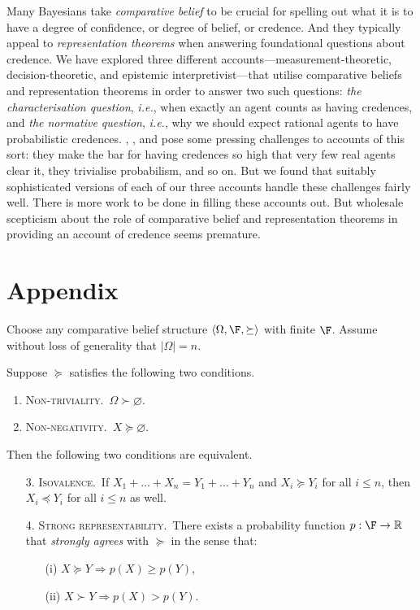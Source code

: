 Many Bayesians take \textit{comparative belief} to be crucial for spelling out what it is to have a degree of confidence, or degree of belief, or credence. And they typically appeal to \textit{representation theorems} when answering foundational questions about credence. We have explored three different accounts---measurement-theoretic, decision-theoretic, and epistemic interpretivist---that utilise comparative beliefs and representation theorems in order to answer two such questions: \textit{the characterisation question}, \textit{i.e.}, when exactly an agent counts as having credences, and \textit{the normative question}, \textit{i.e.}, why we should expect rational agents to have probabilistic credences. \citet{Hajek2009b}, \citet{Meacham2011}, and \citet{Titelbaum2015} pose some pressing challenges to accounts of this sort: they make the bar for having credences so high that very few real agents clear it, they trivialise probabilism, and so on. But we found that suitably sophisticated versions of each of our three accounts handle these challenges fairly well. There is more work to be done in filling these accounts out. But wholesale scepticism about the role of comparative belief and representation theorems in providing an account of credence seems premature. 


\section{Appendix}\label{konek-sec-9}

Choose any comparative belief structure $\left<\Omega,\F,\succeq\right>$ with finite $\F$. Assume without loss of generality that $|\Omega|=n$.

\begin{theorem}
Suppose $\succeq$ satisfies the following two conditions.
\begin{enumerate}
\item \textsc{Non-triviality.}\, $\Omega\succ \varnothing$.
\item \textsc{Non-negativity.}\, $X\succeq \varnothing$.
\end{enumerate}
Then the following two conditions are equivalent.
\begin{enumerate}
\item[3.] \textsc{Isovalence.}\, If $X_1+\ldots+X_n=Y_1+\ldots+Y_n$ and $X_i\succeq Y_i$ for all $i\leq n$, then $X_i\preceq Y_i$ for all $i\leq n$ as well.
\item[4.] \textsc{Strong representability.}\, There exists a probability function $p:\F\rightarrow\mathbb{R}$ that \textit{strongly agrees} with $\succeq$ in the sense that:
	\begin{enumerate}
	\item[(i)] $X\succeq Y \Rightarrow p(X)\geq p(Y)$,
	\item[(ii)] $X\succ Y \Rightarrow p(X)>p(Y)$.
	\end{enumerate}
\end{enumerate}
\end{theorem}

